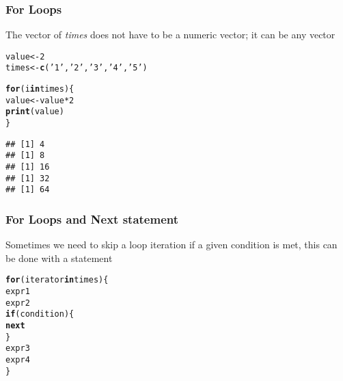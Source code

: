 \documentclass[12pt]{beamer}\usepackage[]{graphicx}\usepackage[]{color}
\makeatletter
\newcommand{\hlnum}[1]{\textcolor[rgb]{0.686,0.059,0.569}{#1}}%
\newcommand{\hlstr}[1]{\textcolor[rgb]{0.192,0.494,0.8}{#1}}%
\newcommand{\hlopt}[1]{\textcolor[rgb]{0,0,0}{#1}}%
\newcommand{\hlstd}[1]{\textcolor[rgb]{0.345,0.345,0.345}{#1}}%
\newcommand{\hlkwa}[1]{\textcolor[rgb]{0.161,0.373,0.58}{\textbf{#1}}}%
\newcommand{\hlkwb}[1]{\textcolor[rgb]{0.69,0.353,0.396}{#1}}%
\newcommand{\hlkwd}[1]{\textcolor[rgb]{0.737,0.353,0.396}{\textbf{#1}}}%
\newenvironment{kframe}{%
 \def\at@end@of@kframe{}%
 \ifinner\ifhmode%
  \def\at@end@of@kframe{\end{minipage}}%
  \begin{minipage}{\columnwidth}%
 \fi\fi%
 \def\FrameCommand##1{\hskip\@totalleftmargin \hskip-\fboxsep
 \colorbox{shadecolor}{##1}\hskip-\fboxsep
     \hskip-\linewidth \hskip-\@totalleftmargin \hskip\columnwidth}%
 \MakeFramed {\advance\hsize-\width
   \@totalleftmargin\z@ \linewidth\hsize
   \@setminipage}}%
 {\par\unskip\endMakeFramed%
 \at@end@of@kframe}
\newenvironment{knitrout}{}{} %
\makeatother
\begin{document}

\begin{frame}[fragile]
\frametitle{For Loops}

The vector of \textit{times} does not have to be a numeric vector; it can be any vector
\begin{knitrout}\footnotesize
{}\color{fgcolor}\begin{kframe}
\begin{alltt}
\hlstd{value} \hlkwb{<-} \hlnum{2}
\hlstd{times} \hlkwb{<-} \hlkwd{c}\hlstd{(}\hlstr{'1'}\hlstd{,} \hlstr{'2'}\hlstd{,} \hlstr{'3'}\hlstd{,} \hlstr{'4'}\hlstd{,} \hlstr{'5'}\hlstd{)}

\hlkwa{for} \hlstd{(i} \hlkwa{in} \hlstd{times) \{}
  \hlstd{value} \hlkwb{<-} \hlstd{value} \hlopt{*} \hlnum{2}
  \hlkwd{print}\hlstd{(value)}
\hlstd{\}}
\end{alltt}
\begin{verbatim}
## [1] 4
## [1] 8
## [1] 16
## [1] 32
## [1] 64
\end{verbatim}
\end{kframe}
\end{knitrout}

\end{frame}


\begin{frame}[fragile]
\frametitle{For Loops and Next statement}

Sometimes we need to skip a loop iteration if a given condition is met, this can be done with a  statement
\begin{knitrout}\footnotesize
{}\color{fgcolor}\begin{kframe}
\begin{alltt}
\hlkwa{for} \hlstd{(iterator} \hlkwa{in} \hlstd{times) \{}
  \hlstd{expr1}
  \hlstd{expr2}
  \hlkwa{if} \hlstd{(condition) \{}
    \hlkwa{next}
  \hlstd{\}}
  \hlstd{expr3}
  \hlstd{expr4}
\hlstd{\}}
\end{alltt}
\end{kframe}
\end{knitrout}

\end{frame}

\end{document}
